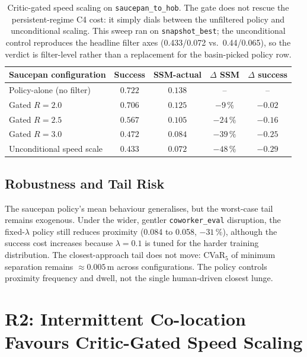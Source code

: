 \documentclass[11pt,a4paper]{report}
\begin{document}
\begin{table}[h]
\centering
\caption{Critic-gated speed scaling on \texttt{saucepan\_to\_hob}. The
gate does not rescue the persistent-regime C4 cost: it simply dials
between the unfiltered policy and unconditional scaling. This sweep ran
on \texttt{snapshot\_best}; the unconditional control reproduces the
headline filter axes (0.433/0.072 vs.\ 0.44/0.065), so the verdict is
filter-level rather than a replacement for the basin-picked policy
row.}
\label{tab:saucepan-gated}
\small
\begin{tabular}{lcccc}
\toprule
Saucepan configuration & Success & SSM-actual & $\Delta$ SSM & $\Delta$ success \\
\midrule
Policy-alone (no filter) & $0.722$ & $0.138$ & -- & -- \\
Gated $R=2.0$ & $0.706$ & $0.125$ & $-9\,\%$ & $-0.02$ \\
Gated $R=2.5$ & $0.567$ & $0.105$ & $-24\,\%$ & $-0.16$ \\
Gated $R=3.0$ & $0.472$ & $0.084$ & $-39\,\%$ & $-0.25$ \\
Unconditional speed scale & $0.433$ & $0.072$ & $-48\,\%$ & $-0.29$ \\
\bottomrule
\end{tabular}
\end{table}

\subsection{Robustness and Tail Risk}
\label{sec:results:tail}
\label{sec:results:ood}
\label{sec:exogenous}

The saucepan policy's mean behaviour generalises, but the worst-case
tail remains exogenous. Under the wider, gentler
\texttt{coworker\_eval} disruption, the fixed-$\lambda$ policy still
reduces proximity (0.084 to 0.058, $-31\,\%$), although the success
cost increases because $\lambda=0.1$ is tuned for the harder training
distribution. The closest-approach tail does not move: CVaR$_5$ of
minimum separation remains $\approx0.005$\,m across configurations.
The policy controls proximity frequency and dwell, not the single
human-driven closest lunge.

\section{R2: Intermittent Co-location Favours Critic-Gated Speed Scaling}
\label{sec:results:intermittent}
\label{sec:results:wcsac}
\end{document}
